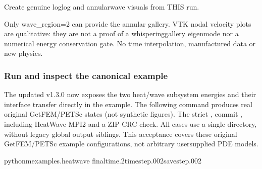 \documentclass[letterpaper,10pt,english]{sphinxmanual}
\begin{document}
\begin{fulllineitems}
\label{\detokenize{examples/heat_wave:examples.heat_wave.render_heat_wave_long_showcase}}
\pysigstartsignatures
\pysiglinewithargsret
{}
{\sphinxparamcomma {}\sphinxparamcomma {}\sphinxparamcomma {}\sphinxparamcomma {}\sphinxparamcomma {}}
{}
\pysigstopsignatures
\sphinxAtStartPar
Create genuine log\sphinxhyphen{}log and annular\sphinxhyphen{}wave visuals from THIS run.

\sphinxAtStartPar
Only wave\_region=2 can provide the annular gallery. VTK nodal
velocity plots are qualitative: they are not a proof of a
whispering\sphinxhyphen{}gallery eigenmode nor a numerical energy conservation
gate. No time interpolation, manufactured data or new physics.

\end{fulllineitems}



\subsubsection{Run and inspect the canonical example}
\label{\detokenize{examples/heat_wave:run-and-inspect-the-canonical-example}}
\sphinxAtStartPar
The updated v1.3.0  now exposes the two heat/wave
subsystem energies and their interface transfer directly
in the  example. The following command produces
real original GetFEM/PETSc states (not synthetic figures).
The strict , commit ,
including Heat\textendash{}Wave MPI2 and a ZIP CRC check.
All cases use a single  directory,
without legacy global output siblings. This acceptance
covers these original GetFEM/PETSc example configurations,
not arbitrary user\sphinxhyphen{}supplied PDE models.

\begin{sphinxVerbatim}[commandchars=\\\{\}]
python\PYGZhy{}mexamples.heat\PYGZus{}wave
\PYGZhy{}\PYGZhy{}final\PYGZhy{}time.2\PYGZhy{}\PYGZhy{}time\PYGZhy{}step.002\PYGZhy{}\PYGZhy{}save\PYGZhy{}step.002
\end{sphinxVerbatim}
\end{document}

